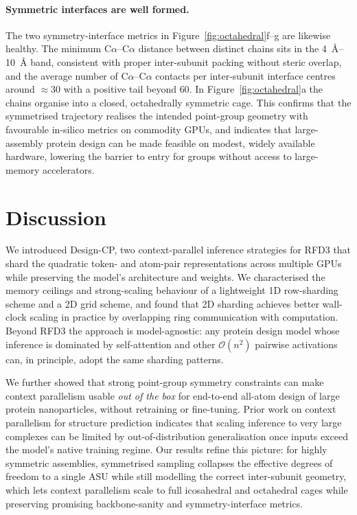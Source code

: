 \paragraph{Symmetric interfaces are well formed.}
The two symmetry-interface metrics in Figure~\ref{fig:octahedral}f--g are likewise
healthy. The minimum C$\alpha$--C$\alpha$ distance between distinct chains sits in
the \SIrange{4}{10}{\angstrom} band, consistent with proper inter-subunit packing
without steric overlap, and the average number of C$\alpha$--C$\alpha$ contacts
per inter-subunit interface centres around $\approx 30$ with a positive tail
beyond $60$. In Figure~\ref{fig:octahedral}a the chains organise into a closed,
octahedrally symmetric cage. This confirms that the symmetrised trajectory
realises the intended point-group geometry with favourable in-silico metrics on
commodity GPUs, and indicates that large-assembly protein design can be made
feasible on modest, widely available hardware, lowering the barrier to entry for
groups without access to large-memory accelerators.

\section{Discussion}
\label{sec:discussion}

We introduced Design-CP, two context-parallel inference strategies for RFD3 that
shard the quadratic token- and atom-pair representations across multiple GPUs
while preserving the model's architecture and weights. We characterised the memory
ceilings and strong-scaling behaviour of a lightweight 1D row-sharding scheme and
a 2D grid scheme, and found that 2D sharding achieves better wall-clock scaling in
practice by overlapping ring communication with computation. Beyond RFD3 the
approach is model-agnostic: any protein design model whose inference is dominated
by self-attention and other $\mathcal{O}(n^2)$ pairwise activations can, in
principle, adopt the same sharding patterns.

We further showed that strong point-group symmetry constraints can make context
parallelism usable \emph{out of the box} for end-to-end all-atom design of large
protein nanoparticles, without retraining or fine-tuning. Prior work on context
parallelism for structure prediction \parencite{lin_fold-cp_2026} indicates that
scaling inference to very large complexes can be limited by out-of-distribution
generalisation once inputs exceed the model's native training regime. Our results
refine this picture: for highly symmetric assemblies, symmetrised sampling
collapses the effective degrees of freedom to a single ASU while still modelling
the correct inter-subunit geometry, which lets context parallelism scale to full
icosahedral and octahedral cages while preserving promising backbone-sanity and
symmetry-interface metrics.

